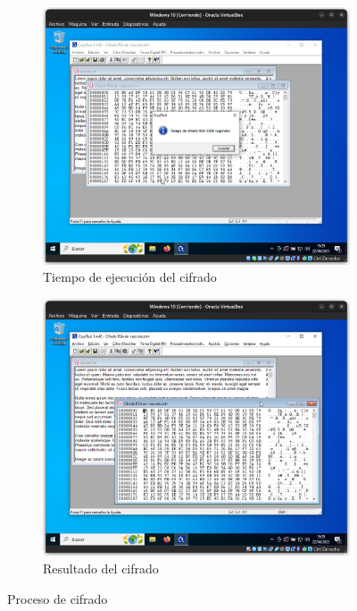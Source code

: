 \begin{figure}[H]
    \centering
    \begin{subfigure}{.5\textwidth}
        \centering
        \includegraphics[width=\textwidth]{EncriptadoRSA-2}
        \caption{Tiempo de ejecución del cifrado}
        \label{fig:RSA-ciph-time}
    \end{subfigure}%
    \begin{subfigure}{.5\textwidth}
        \centering
        \includegraphics[width=\textwidth]{EncriptadoRSA-3}
        \caption{Resultado del cifrado}
    \end{subfigure}
    \caption{Proceso de cifrado}
    \label{fig:RSA-ciph}
\end{figure}

